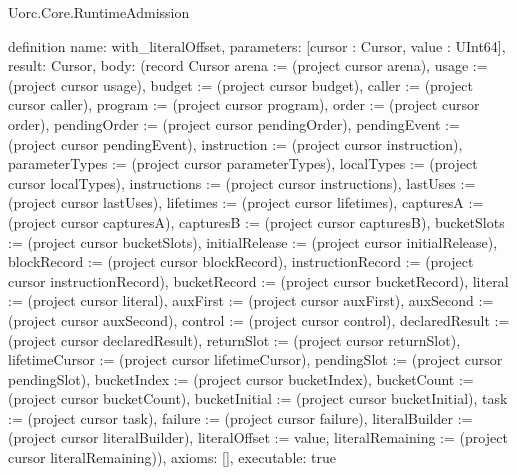 \begin{lexlean}{Uorc.Core.RuntimeAdmission}
\begin{semanticmodule}
definition{
  name: with_literalOffset,
  parameters: [cursor : Cursor, value : UInt64],
  result: Cursor,
  body: (record Cursor {arena := (project cursor arena), usage := (project cursor usage), budget := (project cursor budget), caller := (project cursor caller), program := (project cursor program), order := (project cursor order), pendingOrder := (project cursor pendingOrder), pendingEvent := (project cursor pendingEvent), instruction := (project cursor instruction), parameterTypes := (project cursor parameterTypes), localTypes := (project cursor localTypes), instructions := (project cursor instructions), lastUses := (project cursor lastUses), lifetimes := (project cursor lifetimes), capturesA := (project cursor capturesA), capturesB := (project cursor capturesB), bucketSlots := (project cursor bucketSlots), initialRelease := (project cursor initialRelease), blockRecord := (project cursor blockRecord), instructionRecord := (project cursor instructionRecord), bucketRecord := (project cursor bucketRecord), literal := (project cursor literal), auxFirst := (project cursor auxFirst), auxSecond := (project cursor auxSecond), control := (project cursor control), declaredResult := (project cursor declaredResult), returnSlot := (project cursor returnSlot), lifetimeCursor := (project cursor lifetimeCursor), pendingSlot := (project cursor pendingSlot), bucketIndex := (project cursor bucketIndex), bucketCount := (project cursor bucketCount), bucketInitial := (project cursor bucketInitial), task := (project cursor task), failure := (project cursor failure), literalBuilder := (project cursor literalBuilder), literalOffset := value, literalRemaining := (project cursor literalRemaining)}),
  axioms: [],
  executable: true
}


\end{semanticmodule}
\end{lexlean}
